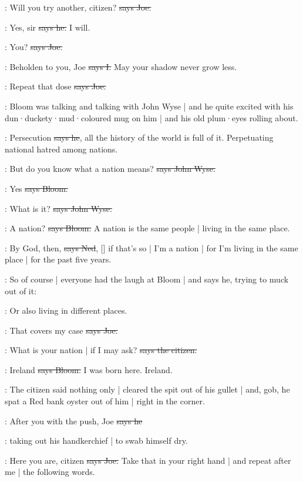 \joe:
Will you try another,
citizen?
\sout{says Joe.}

\citizen:
Yes,
sir
\sout{says he.}
I will.

\joe:
You?
\sout{says Joe.}

:
Beholden to you,
Joe
\sout{says I.}
May your shadow never grow less.

\joe:
Repeat that dose
\sout{says Joe.}

\Nq:
Bloom was talking and talking with John Wyse |
and he quite excited with his dun·duckety·mud·coloured mug on him |
and his old plum·eyes rolling about.

\Bloom:
Persecution
\sout{says he},
all the history of the world is full of it.
Perpetuating national hatred among nations.

\johnwyse:
But do you know what a nation means?
\sout{says John Wyse.}

\Bloom:
Yes
\sout{says Bloom.}

\johnwyse:
What is it?
\sout{says John Wyse.}

\Bloom:
A nation?
\sout{says Bloom.}
A nation is the same people |
living in the same place.

\lambert:
By God,
then,
\sout{says Ned},
[]
if that's so |
I'm a nation |
for I'm living in the same place |
for the past five years.

\Nq:
So of course |
everyone had the laugh at Bloom |
and says he,
trying to muck out of it:

\Bloom:
Or also living in different places.

\joe:
That covers my case
\sout{says Joe.}

\citizen:
What is your nation |
if I may ask?
\sout{says the citizen.}

\Bloom:
Ireland
\sout{says Bloom.}
I was born here.
Ireland.

\Nq:
The citizen said nothing only |
cleared the spit out of his gullet |
and,
gob,
he spat a Red bank oyster out of him |
right in the corner.

\citizen:
After you with the push,
Joe
\sout{says he}

\Nq:
taking out his handkerchief |
to swab himself dry.

\joe:
Here you are,
citizen
\sout{says Joe.}
Take that in your right hand |
and repeat after me |
the following words.

